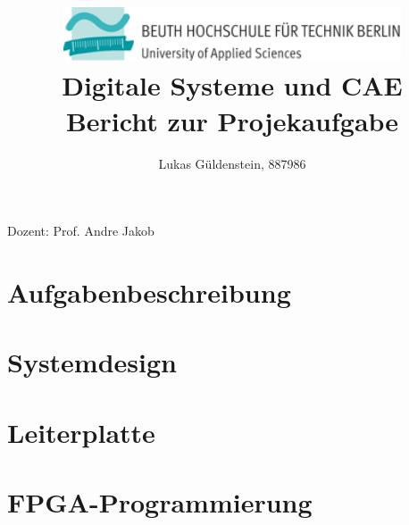 \documentclass[a4paper, 11pt, fleqn, captions=nooneline]{scrartcl}
\renewcommand*{\*}{\cdot}
\newcommand{\thetitle}{Digitale Systeme und CAE \\ Bericht zur Projekaufgabe}
\newcommand{\theauhors}{Lukas Güldenstein, 887986}
\begin{document}
\title{\includegraphics[width=10cm]{Grafiken/Beuth_Logo_horizontal}
		\vspace{1cm}\\ \thetitle}
\author{\theauhors}

\maketitle
\begin{center}
	Dozent: Prof. Andre Jakob
\end{center}
\thispagestyle{empty}
\newpage
\tableofcontents
\thispagestyle{empty}
\newpage
\setcounter{page}{1}

\section{Aufgabenbeschreibung}
\section{Systemdesign}
\section{Leiterplatte}
\section{FPGA-Programmierung}
\end{document}
